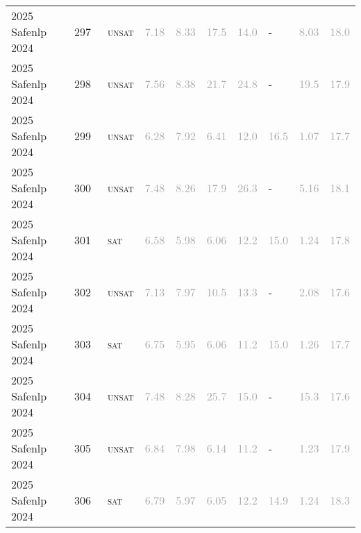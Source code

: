 \begin{center}
{\begin{longtable}{@{}llllllllll@{}}
2025 Safenlp 2024 & 297 & ~\textsc{unsat} & \textcolor{darkgray}{7.18} & \textcolor{darkgray}{8.33} & \textcolor{darkgray}{17.5} & \textcolor{darkgray}{14.0} & - & \textcolor{darkgray}{8.03} & \textcolor{darkgray}{18.0} \\
2025 Safenlp 2024 & 298 & ~\textsc{unsat} & \textcolor{darkgray}{7.56} & \textcolor{darkgray}{8.38} & \textcolor{darkgray}{21.7} & \textcolor{darkgray}{24.8} & - & \textcolor{darkgray}{19.5} & \textcolor{darkgray}{17.9} \\
2025 Safenlp 2024 & 299 & ~\textsc{unsat} & \textcolor{darkgray}{6.28} & \textcolor{darkgray}{7.92} & \textcolor{darkgray}{6.41} & \textcolor{darkgray}{12.0} & \textcolor{darkgray}{16.5} & \textcolor{darkgray}{1.07} & \textcolor{darkgray}{17.7} \\
2025 Safenlp 2024 & 300 & ~\textsc{unsat} & \textcolor{darkgray}{7.48} & \textcolor{darkgray}{8.26} & \textcolor{darkgray}{17.9} & \textcolor{darkgray}{26.3} & - & \textcolor{darkgray}{5.16} & \textcolor{darkgray}{18.1} \\
2025 Safenlp 2024 & 301 & ~\textsc{sat} & \textcolor{darkgray}{6.58} & \textcolor{darkgray}{5.98} & \textcolor{darkgray}{6.06} & \textcolor{darkgray}{12.2} & \textcolor{darkgray}{15.0} & \textcolor{darkgray}{1.24} & \textcolor{darkgray}{17.8} \\
2025 Safenlp 2024 & 302 & ~\textsc{unsat} & \textcolor{darkgray}{7.13} & \textcolor{darkgray}{7.97} & \textcolor{darkgray}{10.5} & \textcolor{darkgray}{13.3} & - & \textcolor{darkgray}{2.08} & \textcolor{darkgray}{17.6} \\
2025 Safenlp 2024 & 303 & ~\textsc{sat} & \textcolor{darkgray}{6.75} & \textcolor{darkgray}{5.95} & \textcolor{darkgray}{6.06} & \textcolor{darkgray}{11.2} & \textcolor{darkgray}{15.0} & \textcolor{darkgray}{1.26} & \textcolor{darkgray}{17.7} \\
2025 Safenlp 2024 & 304 & ~\textsc{unsat} & \textcolor{darkgray}{7.48} & \textcolor{darkgray}{8.28} & \textcolor{darkgray}{25.7} & \textcolor{darkgray}{15.0} & - & \textcolor{darkgray}{15.3} & \textcolor{darkgray}{17.6} \\
2025 Safenlp 2024 & 305 & ~\textsc{unsat} & \textcolor{darkgray}{6.84} & \textcolor{darkgray}{7.98} & \textcolor{darkgray}{6.14} & \textcolor{darkgray}{11.2} & - & \textcolor{darkgray}{1.23} & \textcolor{darkgray}{17.9} \\
2025 Safenlp 2024 & 306 & ~\textsc{sat} & \textcolor{darkgray}{6.79} & \textcolor{darkgray}{5.97} & \textcolor{darkgray}{6.05} & \textcolor{darkgray}{12.2} & \textcolor{darkgray}{14.9} & \textcolor{darkgray}{1.24} & \textcolor{darkgray}{18.3} \\

\end{longtable}}
\end{center}

